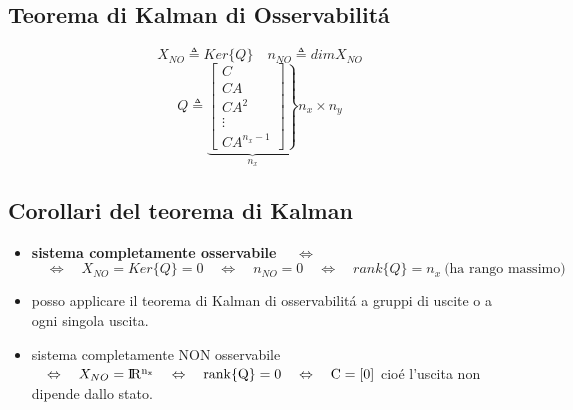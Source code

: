 \documentclass[../main.tex]{subfiles}
\begin{document}
	\subsection{Teorema di Kalman di Osservabilit\'a}
		\[
			X_{NO} \triangleq Ker\{Q\} \quad n_{NO} \triangleq dim { X_{NO} }
		\]
		\[
			Q \triangleq
			\underbrace{
				\left. 
				\begin{bmatrix}
					C\\
					CA\\
					CA^2\\
					\vdots\\
					CA^{n_x-1}
				\end{bmatrix}
			\right\rbrace 
			}_{n_x}
			n_x \times n_y
		\]
	\subsection{Corollari del teorema di Kalman}
		\begin{itemize}
			\item
				\textbf{sistema completamente osservabile} $ \quad\Leftrightarrow\quad $
				\[
					\quad\Leftrightarrow\quad X_{NO} = Ker\{Q\} = {0} \quad\Leftrightarrow\quad n_{NO} = 0 \quad\Leftrightarrow\quad rank\{Q\} = n_x\ \text{(ha rango massimo)}
				\]
			\item 
				posso applicare il teorema di Kalman di osservabilit\'a a gruppi di uscite o a ogni singola uscita.
			\item 
				sistema completamente NON osservabile $ \quad\Leftrightarrow\quad X_{NO} = \rm I\!R^{n_x} \quad\Leftrightarrow\quad rank\{Q\} = 0 \quad\Leftrightarrow\quad C = [0] $ cio\'e l'uscita non dipende dallo stato.
		\end{itemize}
	
\end{document}
